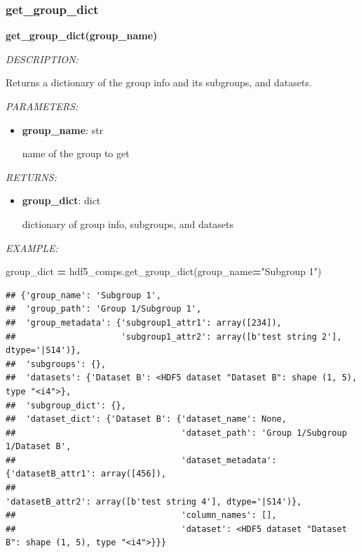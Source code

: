\documentclass[
]{article}
\newenvironment{Shaded}{\begin{snugshade}}{\end{snugshade}}
\newcommand{\NormalTok}[1]{#1}
\newcommand{\OperatorTok}[1]{\textcolor[rgb]{0.81,0.36,0.00}{\textbf{#1}}}
\newcommand{\StringTok}[1]{\textcolor[rgb]{0.31,0.60,0.02}{#1}}
\begin{document}
\hypertarget{get_group_dict}{%
\subsubsection{get\_group\_dict}\label{get_group_dict}}

\textbf{get\_group\_dict(group\_name)}

\emph{DESCRIPTION:}

Returns a dictionary of the group info and its subgroups, and datasets.

\emph{PARAMETERS:}

\begin{itemize}
\item
  \textbf{group\_name}: str

  name of the group to get
\end{itemize}

\emph{RETURNS:}

\begin{itemize}
\item
  \textbf{group\_dict}: dict

  dictionary of group info, subgroups, and datasets
\end{itemize}

\emph{EXAMPLE:}

\begin{Shaded}
\begin{Highlighting}[]
\NormalTok{group_dict }\OperatorTok{=}\NormalTok{ hdf5_comps.get_group_dict(group_name}\OperatorTok{=}\StringTok{"Subgroup 1"}\NormalTok{)}
\end{Highlighting}
\end{Shaded}

\begin{verbatim}
## {'group_name': 'Subgroup 1',
##  'group_path': 'Group 1/Subgroup 1',
##  'group_metadata': {'subgroup1_attr1': array([234]),
##                     'subgroup1_attr2': array([b'test string 2'], dtype='|S14')},
##  'subgroups': {},
##  'datasets': {'Dataset B': <HDF5 dataset "Dataset B": shape (1, 5), type "<i4">},
##  'subgroup_dict': {},
##  'dataset_dict': {'Dataset B': {'dataset_name': None,
##                                 'dataset_path': 'Group 1/Subgroup 1/Dataset B',
##                                 'dataset_metadata': {'datasetB_attr1': array([456]),
##                                                      'datasetB_attr2': array([b'test string 4'], dtype='|S14')},
##                                 'column_names': [],
##                                 'dataset': <HDF5 dataset "Dataset B": shape (1, 5), type "<i4">}}}
\end{verbatim}
\end{document}

